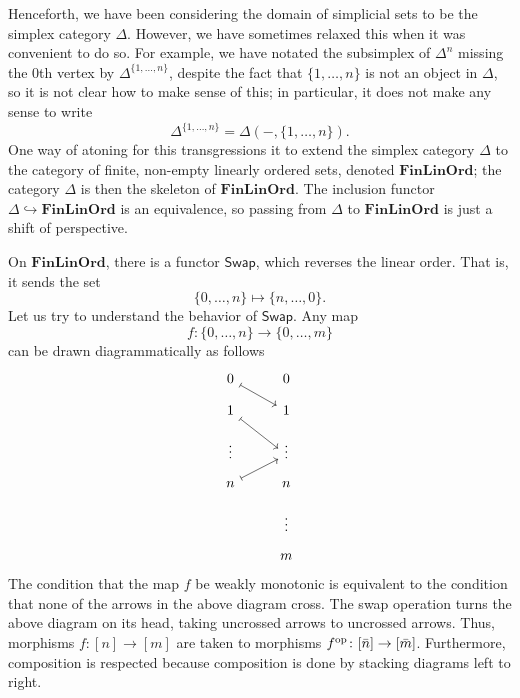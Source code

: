\documentclass[main.tex]{subfiles}
\begin{document}
Henceforth, we have been considering the domain of simplicial sets to be the simplex category $\Delta$. However, we have sometimes relaxed this when it was convenient to do so. For example, we have notated the subsimplex of $\Delta^{n}$ missing the 0th vertex by $\Delta^{\{1, \ldots, n\}}$, despite the fact that $\{1, \ldots, n\}$ is not an object in $\Delta$, so it is not clear how to make sense of this; in particular, it does not make any sense to write
\begin{equation*}
  \Delta^{\{1, \ldots, n\}} = \Delta(-, \{1, \ldots, n\}).
\end{equation*}
One way of atoning for this transgressions it to extend the simplex category $\Delta$ to the category of finite, non-empty linearly ordered sets, denoted $\mathbf{FinLinOrd}$; the category $\Delta$ is then the skeleton of $\mathbf{FinLinOrd}$. The inclusion functor $\Delta \hookrightarrow \mathbf{FinLinOrd}$ is an equivalence, so passing from $\Delta$ to $\mathbf{FinLinOrd}$ is just a shift of perspective.

On $\mathbf{FinLinOrd}$, there is a functor $\mathsf{Swap}$, which reverses the linear order. That is, it sends the set
\begin{equation*}
  \{0, \ldots, n\} \mapsto \{n, \ldots, 0\}.
\end{equation*}
Let us try to understand the behavior of $\mathsf{Swap}$. Any map
\begin{equation*}
  f\colon \{0, \ldots, n\} \to \{0, \ldots, m\}
\end{equation*}
can be drawn diagrammatically as follows
\begin{equation*}
  \begin{tikzcd}[row sep=small]
    0
    \arrow[dr, mapsto]
    & 0
    \\
    1
    \arrow[dr, mapsto]
    & 1
    \\
    \vdots
    & \vdots
    \\
    n
    \arrow[ur, mapsto]
    & n
    \\
    & \vdots
    \\
    & m
  \end{tikzcd}
\end{equation*}
The condition that the map $f$ be weakly monotonic is equivalent to the condition that none of the arrows in the above diagram cross. The swap operation turns the above diagram on its head, taking uncrossed arrows to uncrossed arrows. Thus, morphisms $f\colon [n] \to [m]$ are taken to morphisms $f^{\mathrm{op}}\colon [\bar{n}] \to [\bar{m}]$. Furthermore, composition is respected because composition is done by stacking diagrams left to right.
\end{document}
